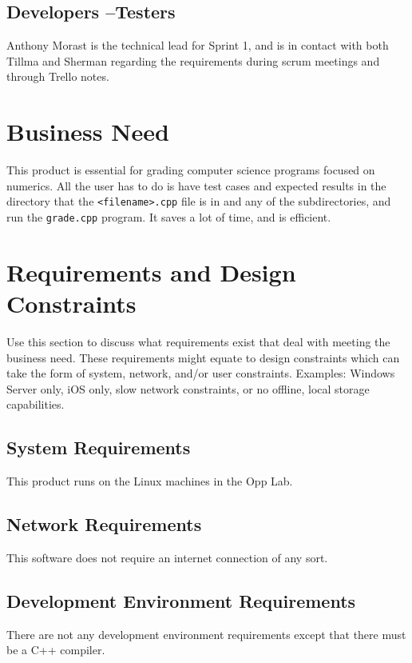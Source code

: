 

\subsection{Developers --Testers}
Anthony Morast is the technical lead for Sprint 1, and is in contact with both Tillma and Sherman regarding the requirements during scrum meetings and through Trello notes. 



\section{Business Need}
This product is essential for grading computer science programs focused on numerics. All the user has to do is have test cases and expected results in the directory that the {\tt <filename>.cpp} file is in and any of the subdirectories, and run the {\tt grade.cpp} program. It saves a lot of time, and is efficient. 

\section{Requirements and Design Constraints}
Use this section to discuss what requirements exist that deal with meeting the 
business need.  These requirements might equate to design constraints which can 
take the form of system, network, and/or user constraints.  Examples:  Windows 
Server only, iOS only, slow network constraints, or no offline, local storage capabilities. 


\subsection{System  Requirements}
This product runs on the Linux machines in the Opp Lab. 


\subsection{Network Requirements}
This software does not require an internet connection of any sort. 


\subsection{Development Environment Requirements}
There are not any development environment requirements except that there must be a C++ compiler.


